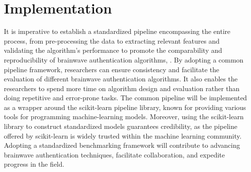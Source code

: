 \chapter{Implementation}
\label{ch:Framework}

It is imperative to establish a standardized pipeline encompassing the entire process, from pre-processing the data to extracting relevant features and validating the algorithm's performance to promote the comparability and reproducibility of brainwave authentication algorithms, \cite{moabb}. By adopting a common pipeline framework, researchers can ensure consistency and facilitate the evaluation of different brainwave authentication algorithms. It also enables the researchers to spend more time on algorithm design and evaluation rather than doing repetitive and error-prone tasks. The common pipeline will be implemented as a wrapper around the scikit-learn pipeline library, known for providing various tools for programming machine-learning models. Moreover, using the scikit-learn library to construct standardized models guarantees credibility, as the pipeline offered by scikit-learn is widely trusted within the machine learning community. Adopting a standardized benchmarking framework will contribute to advancing brainwave authentication techniques, facilitate collaboration, and expedite progress in the field. 

